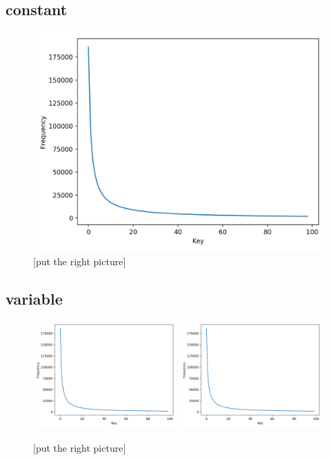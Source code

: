 \subsection{constant}\label{sec:constant}
\begin{figure}[!htb]
  \centering
  \includegraphics[width=\textwidth,height=\textheight,keepaspectratio]{img/skew-alpha1.png}
  \caption[caption]{ [put the right picture] }
  \label{fig:b+tree}
\end{figure}
\newpage
\subsection{variable}\label{sec:variable}
\begin{figure}[!htb]
  \centering
  \includegraphics[width=0.49\textwidth,height=\textheight,keepaspectratio]{img/skew-alpha1.png}
  \includegraphics[width=0.49\textwidth,height=\textheight,keepaspectratio]{img/skew-alpha1.png}
  \caption[caption]{ [put the right picture] }
  \label{fig:b+tree}
\end{figure}
